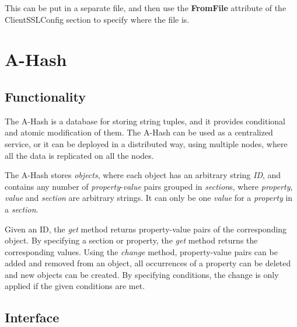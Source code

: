 \documentclass{book}
\begin{document}
This can be put in a separate file, and then use the \textbf{FromFile} attribute of the ClientSSLConfig section to specify where the file is.


\newpage

\section{A-Hash} %
\label{sec:a_hash}

\subsection{Functionality} %

The A-Hash is a database for storing string tuples, and it provides conditional and atomic modification of them. The A-Hash can be used as a centralized service, or it can be deployed in a distributed way, using multiple nodes, where all the data is replicated on all the nodes.

The A-Hash stores \emph{objects}, where each object has an arbitrary string \emph{ID}, and contains any number of \emph{property}-\emph{value} pairs grouped in \emph{section}s, where \emph{property}, \emph{value} and \emph{section} are arbitrary strings. It can only be one \emph{value} for a \emph{property} in a \emph{section}.

Given an ID, the \emph{get} method returns property-value pairs of the corresponding object. By specifying a section or property, the \emph{get} method returns the corresponding values. Using the \emph{change} method, property-value pairs can be added and removed from an object, all occurrences of a property can be deleted and new objects can be created. By specifying conditions, the change is only applied if the given conditions are met.


\subsection{Interface} %
\end{document}
